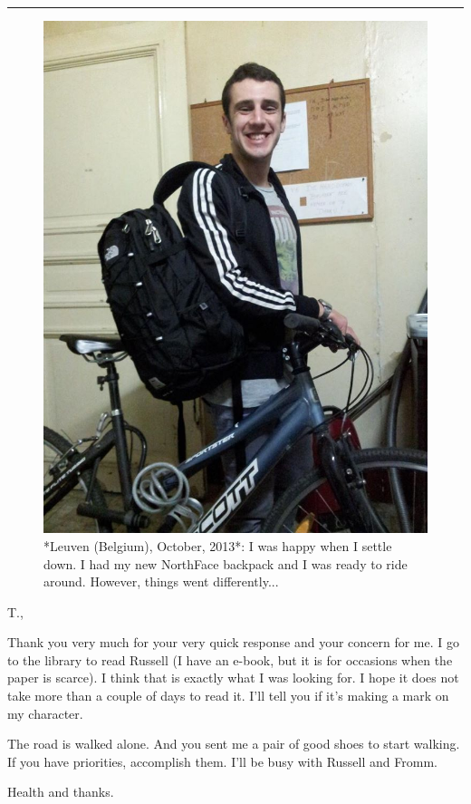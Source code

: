 \documentclass[]{book}
\begin{document}
\begin{center}\rule{0.5\linewidth}{\linethickness}\end{center}

\begin{figure}

{\centering \includegraphics[width=0.75\linewidth]{images/2014/bike} 

}

\caption{*Leuven (Belgium), October, 2013*: I was happy when I settle down. I had my new NorthFace backpack and I was ready to ride around. However, things went differently... }\label{fig:bike}
\end{figure}

T.,

Thank you very much for your very quick response and your concern for me.
I go to the library to read Russell (I have an e-book, but it is for occasions when the paper is scarce). I think that is exactly what I was looking for. I hope it does not take more than a couple of days to read it. I'll tell you if it's making a mark on my character.

The road is walked alone. And you sent me a pair of good shoes to start walking. If you have priorities, accomplish them. I'll be busy with Russell and Fromm.

Health and thanks.
\end{document}
